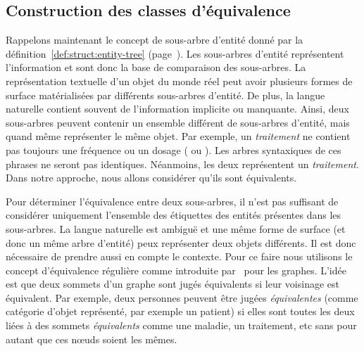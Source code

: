 \subsection{Construction des classes d'équivalence}
\label{sec:struct:equiv-classes}
Rappelons maintenant le concept de sous-arbre d'entité donné par la définition~\ref{def:struct:entity-tree} (page~\pageref{def:struct:entity-tree}).
Les sous-arbres d'entité représentent l'information et sont donc la base de comparaison des sous-arbres.
La représentation textuelle d'un objet du monde réel peut avoir plusieurs formes de surface matérialisées par différents sous-arbres d'entité.
De plus, la langue naturelle contient souvent de l'information implicite ou manquante.
Ainsi, deux sous-arbres peuvent contenir un ensemble différent de sous-arbres d'entité, mais quand même représenter le même objet.
Par exemple, un \emph{traitement} ne contient pas toujours une fréquence ou un dosage ( ou ).
Les arbres syntaxiques de ces phrases ne seront pas identiques.
Néanmoins, les deux représentent un \emph{traitement}.
Dans notre approche, nous allons considérer qu'ils sont équivalents.

Pour déterminer l'équivalence entre deux sous-arbres, il n'est pas suffisant de considérer uniquement l'ensemble des étiquettes des entités présentes dans les sous-arbres.
La langue naturelle est ambiguë et une même forme de surface (et donc un même arbre d'entité) peux représenter deux objets différents.
Il est donc nécessaire de prendre aussi en compte le contexte.
Pour ce faire nous utilisons le concept d'équivalence régulière comme introduite par~\cite{whiteGraphSemigroupHomomorphisms1983} pour les graphes.
L'idée est que deux sommets d'un graphe sont jugés équivalents si leur voisinage est équivalent.
Par exemple, deux personnes peuvent être jugées \emph{équivalentes} (comme catégorie d'objet représenté, par exemple un patient) si elles sont toutes les deux liées à des sommets \emph{équivalents} comme une maladie, un traitement, etc sans pour autant que ces nœuds soient les mêmes.

